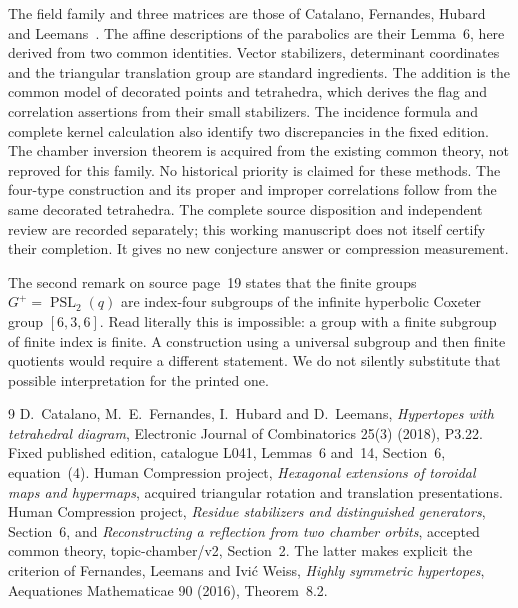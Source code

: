 \documentclass[11pt,a4paper]{article}
\begin{document}
The field family and three matrices are those of Catalano,
Fernandes, Hubard and Leemans~\cite{source}. The affine descriptions
of the parabolics are their Lemma~6, here derived from two common
identities. Vector stabilizers, determinant coordinates and the
triangular translation group are standard ingredients. The addition
is the common model of decorated points and tetrahedra, which
derives the flag and correlation assertions from their small
stabilizers. The incidence formula and complete kernel calculation
also identify two discrepancies in the fixed edition. The chamber
inversion theorem is acquired from the existing common theory,
not reproved for this family. No historical priority is claimed
for these methods.
The four-type construction and its proper and improper correlations
follow from the same decorated tetrahedra. The complete source
disposition and independent review are recorded separately; this
working manuscript does not itself certify their completion.
It gives no new conjecture answer or compression measurement.

The second remark on source page~19 states that the finite groups
$G^+=\operatorname{PSL}_2(q)$ are index-four subgroups of the
infinite hyperbolic Coxeter group $[6,3,6]$. Read literally this
is impossible: a group with a finite subgroup of finite index
is finite. A construction using a universal subgroup and then
finite quotients would require a different statement. We do not
silently substitute that possible interpretation for the printed one.

\begin{thebibliography}{9}
 D.~Catalano, M.~E.~Fernandes, I.~Hubard and
D.~Leemans, \emph{Hypertopes with tetrahedral diagram},
Electronic Journal of Combinatorics 25(3) (2018), P3.22.
Fixed published edition, catalogue L041, Lemmas~6 and~14,
Section~6, equation~(4).
 Human Compression project,
\emph{Hexagonal extensions of toroidal maps and hypermaps},
acquired triangular rotation and translation presentations.
 Human Compression project,
\emph{Residue stabilizers and distinguished generators}, Section~6,
and \emph{Reconstructing a reflection from two chamber orbits},
accepted common theory, topic-chamber/v2, Section~2.
The latter makes explicit the criterion of Fernandes, Leemans
and Ivi\'c Weiss, \emph{Highly symmetric hypertopes},
Aequationes Mathematicae 90 (2016), Theorem~8.2.
\end{thebibliography}
\end{document}
